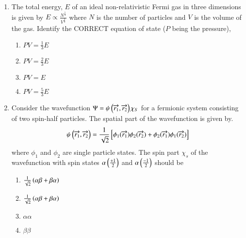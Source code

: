 \documentclass[journal]{IEEEtran}
\begin{document}
\begin{enumerate}[start=14]
    \item The total energy, $E$ of an ideal non-relativistic Fermi gas in three dimensions is given by $E \propto \frac{N^{\frac{5}{3}}}{V^{\frac{2}{3}}}$ where $N$ is the number of particles and $V$ is the volume of the gas.
    Identify the CORRECT equation of state ($P$ being the pressure),
     \begin{multicols}{4}
        \begin{enumerate}
            \item $PV= \frac{1}{3}E$
            \item $PV= \frac{2}{3}E$
            \item $PV=E$
            \item $PV= \frac{5}{3}E$
        \end{enumerate}
    \end{multicols}

    \item Consider the wavefunction $\Psi=\psi\left(\overrightarrow{r_1},\overrightarrow{r_2}\right)\chi_S$ for a fermionic system consisting of two spin-half particles. The spatial part of the wavefunction is given by. 
    \begin{align*}
        \psi \left(\overrightarrow{r_1},\overrightarrow{r_2}\right) = \frac{1}{\sqrt{2}} {}\left[ \phi_1(\overrightarrow{r_1})\phi_2(\overrightarrow{r_2}) + \phi_2(\overrightarrow{r_1})\phi_1(\overrightarrow{r_2})\right]
    \end{align*}
    where $\phi_1$ and $\phi_2$ are single particle states. The spin part $\chi_s$ of the wavefunction with spin states $\alpha \left(\frac{+1}{2}\right)$ and $\alpha \left(\frac{-1}{2}\right)$ should be
     \begin{multicols}{4}
        \begin{enumerate}
            \item $\frac{1}{\sqrt{2}} \left(\alpha \beta + \beta \alpha\right)$
            \item $\frac{1}{\sqrt{2}} \left(\alpha \beta + \beta \alpha\right)$
            \item $\alpha \alpha$
            \item $\beta \beta$
        \end{enumerate}
    \end{multicols}


\end{enumerate}
\end{document}
